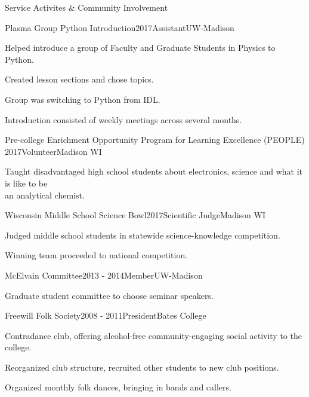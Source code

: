 \documentclass{resume}  %
\begin{document}
\begin{rSection}{Service Activites \& Community Involvement}
  \begin{rSubsection}{Plasma Group Python Introduction}{2017}{Assistant}{UW-Madison}
    \item Helped introduce a group of Faculty and Graduate Students in Physics to Python.
    \item Created lesson sections and chose topics.
    \item Group was switching to Python from IDL.
    \item Introduction consisted of weekly meetings across several months.
  \end{rSubsection}
  \begin{rSubsection}{Pre-college Enrichment Opportunity Program for Learning Excellence (PEOPLE)}
    {2017}{Volunteer}{Madison WI}
	  \item Taught disadvantaged high school students about electronics, science and what it is like
      to be \\ an analytical chemist.
  \end{rSubsection}
  \begin{rSubsection}{Wisconsin Middle School Science Bowl}{2017}{Scientific Judge}{Madison WI}
    \item Judged middle school students in statewide science-knowledge competition.
    \item Winning team proceeded to national competition.
  \end{rSubsection}
  \begin{rSubsection}{McElvain Committee}{2013 - 2014}{Member}{UW-Madison}
    \item Graduate student committee to choose seminar speakers.
  \end{rSubsection}
  \begin{rSubsection}{Freewill Folk Society}{2008 - 2011}{President}{Bates College}
    \item Contradance club, offering alcohol-free community-engaging social activity to the college.
    \item Reorganized club structure, recruited other students to new club positions.
    \item Organized monthly folk dances, bringing in bands and callers.
  \end{rSubsection}
\end{rSection}
\end{document}
